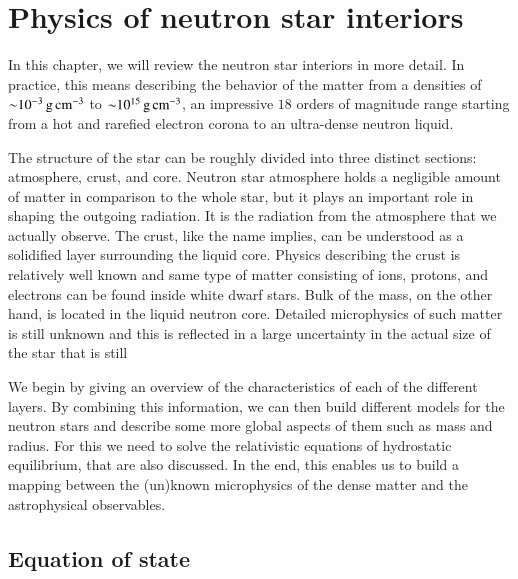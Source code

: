 \chapter{Physics of neutron star interiors} 

In this chapter, we will review the neutron star interiors in more detail.
In practice, this means describing the behavior of the matter from a densities of $\mathord{\sim} 10^{-3} \, \mathrm{g}\,\mathrm{cm}^{-3}$ to $\mathord{\sim} 10^{15} \, \mathrm{g}\,\mathrm{cm}^{-3}$, an impressive $18$ orders of magnitude range starting from a hot and rarefied electron corona to an ultra-dense neutron liquid.

The structure of the star can be roughly divided into three distinct sections: atmosphere, crust, and core.
Neutron star atmosphere holds a negligible amount of matter in comparison to the whole star, but it plays an important role in shaping the outgoing radiation.
It is the radiation from the atmosphere that we actually observe.
The crust, like the name implies, can be understood as a solidified layer surrounding the liquid core.
Physics describing the crust is relatively well known and same type of matter consisting of ions, protons, and electrons can be found inside white dwarf stars.
Bulk of the mass, on the other hand, is located in the liquid neutron core.
Detailed microphysics of such matter is still unknown and this is reflected in a large uncertainty in the actual size of the star that is still 

We begin by giving an overview of the characteristics of each of the different layers.
By combining this information, we can then build different models for the neutron stars and describe some more global aspects of them such as mass and radius.
For this we need to solve the relativistic equations of hydrostatic equilibrium, that are also discussed.
In the end, this enables us to build a mapping between the (un)known microphysics of the dense matter and the astrophysical observables.


\section{Equation of state}
%
%
%
%

